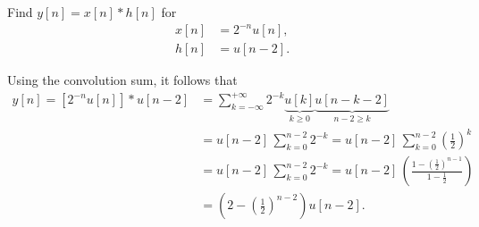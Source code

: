 \documentclass{report}
\begin{document}
\begin{example}
    Find $y[n]=x[n]*h[n]$ for 
    \begin{align*}
        x[n] &= 2^{-n}u[n], \\
        h[n] &= u[n-2].
    \end{align*}
\end{example}
\begin{solution}
    Using the convolution sum, it follows that 
    \begin{align*}
        y[n] = [2^{-n} u[n]] * u[n-2] &= \sum_{k=-\infty}^{+\infty} 2^{-k} \underbrace{u[k]}_\textrm{$k\geq 0$} \underbrace{u[n-k-2]}_\textrm{$n-2\geq k$} \\
        &= u[n-2]\,\sum_{k=0}^{n-2} 2^{-k} = u[n-2]\,\sum_{k=0}^{n-2} \left(\frac{1}{2}\right)^k \\
        &= u[n-2]\,\sum_{k=0}^{n-2} 2^{-k} = u[n-2]\, \left(\frac{1 - \left(\frac{1}{2}\right)^{n-1}}{1 - \frac{1}{2}}\right) \\
        &= \left(2-\left(\frac{1}{2}\right)^{n-2}\right) u[n-2].
    \end{align*}
\end{solution}
\end{document}
